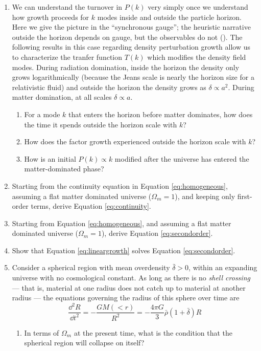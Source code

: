 \begin{enumerate}
\item We can understand the turnover in $P(k)$ very simply once we
understand how growth proceeds for $k$ modes inside and outside the
particle horizon. Here we give the picture in the ``synchronous
gauge''; the heuristic narrative outside the horizon depends on gauge,
but the observables do not (\citealt{ma95a}). The following results in
this case regarding density perturbation growth allow us to
characterize the tranfer function $T(k)$ which modifies the density
field modes.  During radiation domination, inside the horizon the
density only grows logarithmically (because the Jeans scale is nearly
the horizon size for a relativistic fluid) and outside the horizon the
density grows as $\delta\propto a^2$. During matter domination, at all
scales $\delta\propto a$.
\begin{enumerate}
\item For a mode $k$ that enters the horizon before matter dominates,
how does the time it spends outside the horizon scale with $k$? 
\item How does the factor growth experienced outside the horizon scale
with $k$?
\item How is an initial $P(k) \propto k$ modified after the universe
has entered the matter-dominated phase?
\end{enumerate}
\item Starting from the continuity equation in Equation
   \ref{eq:homogeneous}, assuming a flat matter dominated universe
    ($\Omega_m = 1$), and keeping only first-order terms, derive
    Equation \ref{eq:continuity}.
\item Starting from Equation \ref{eq:homogeneous}, and assuming a flat
    matter dominated universe ($\Omega_m = 1$), derive
    Equation \ref{eq:secondorder}.
\item Show that Equation \ref{eq:lineargrowth} solves
Equation \ref{eq:secondorder}.
\item Consider a spherical region with mean overdensity $\bar\delta
>0$, within an expanding universe with no cosmological constant. As
 long as there is no {\it shell crossing} --- that is, material at one
 radius does not catch up to material at another radius --- the
 equations governing the radius of this sphere over time are
 \begin{equation}
\frac{\dd^2 R}{\dd t^2} = - \frac{GM(<r)}{R^2} = - \frac{4\pi
 G}{3} \bar\rho(1+\bar\delta) R
 \end{equation}
\begin{enumerate}
\item In terms of $\Omega_m$ at the present time, what is the
condition that the spherical region will collapse on itself?


\end{enumerate}
\end{enumerate}
